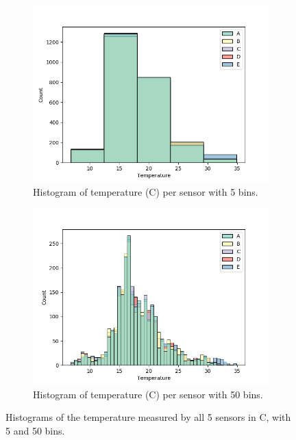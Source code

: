 \documentclass[a4paper,12pt]{article} %
\begin{document}
\begin{enumerate}
\begin{figure}[h!]
	\centering
	\begin{subfigure}[b]{0.4\linewidth}
		\includegraphics[width=\linewidth]{Histogram of temperature per sensor with 5 bins.png}
		\caption{Histogram of temperature (\degree C) per sensor with 5 bins.}
	\end{subfigure}
	\begin{subfigure}[b]{0.4\linewidth}
		\includegraphics[width=\linewidth]{Histogram of temperature per sensor with 50 bins.png}
		\caption{Histogram of temperature (\degree C) per sensor with 50 bins.}
	\end{subfigure}
	\caption{Histograms of the temperature measured by all 5 sensors in \degree C, with 5 and 50 bins.}
	\label{fig:hist5and50}
\end{figure}



\end{enumerate}
\end{document}

